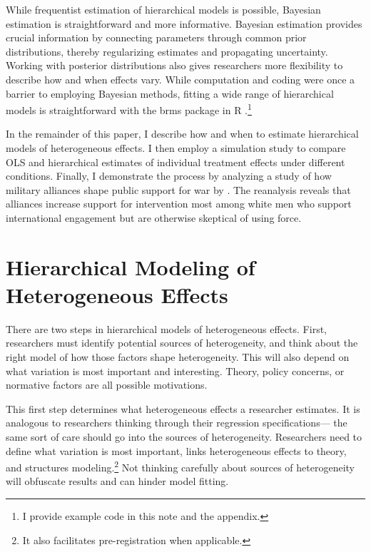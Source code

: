 \documentclass[12pt]{article}
\begin{document}
While frequentist estimation of hierarchical models is possible, Bayesian estimation is straightforward and more informative.
Bayesian estimation provides crucial information by connecting parameters through common prior distributions, thereby regularizing estimates and propagating uncertainty. 
Working with posterior distributions also gives researchers more flexibility to describe how and when effects vary. 
While computation and coding were once a barrier to employing Bayesian methods, fitting a wide range of hierarchical models is straightforward with the brms package in \textsf{R} \citep{Buerkner2017}.\footnote{I provide example code in this note and the appendix.}



In the remainder of this paper, I describe how and when to estimate hierarchical models of heterogeneous effects.
I then employ a simulation study to compare OLS and hierarchical estimates of individual treatment effects under different conditions.
Finally, I demonstrate the process by analyzing a study of how military alliances shape public support for war by \citet{TomzWeeks2021}. 
The reanalysis reveals that alliances increase support for intervention most among white men who support international engagement but are otherwise skeptical of using force. 



\section{Hierarchical Modeling of Heterogeneous Effects}


There are two steps in hierarchical models of heterogeneous effects. 
First, researchers must identify potential sources of heterogeneity, and think about the right model of how those factors shape heterogeneity.
This will also depend on what variation is most important and interesting. 
Theory, policy concerns, or normative factors are all possible motivations. 


This first step determines what heterogeneous effects a researcher estimates. 
It is analogous to researchers thinking through their regression specifications--- the same sort of care should go into the sources of heterogeneity. 
Researchers need to define what variation is most important, links heterogeneous effects to theory, and structures modeling.\footnote{It also facilitates pre-registration when applicable.}
Not thinking carefully about sources of heterogeneity will obfuscate results and can hinder model fitting.
   
\end{document}
